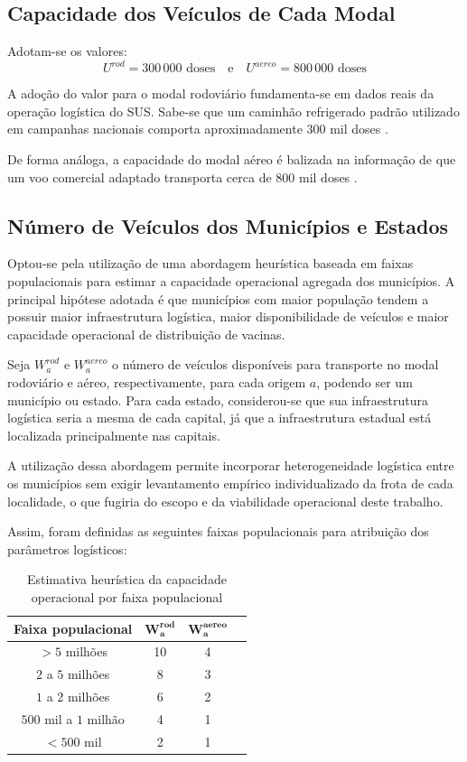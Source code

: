 \subsection{Capacidade dos Veículos de Cada Modal}

Adotam-se os valores:
\[U^{rod} = 300\,000 \text{ doses} \quad \text {e} \quad U^{aereo} = 800\,000 \text{ doses}\]

A adoção do valor para o modal rodoviário fundamenta-se em dados reais da operação logística do SUS. Sabe-se que um caminhão refrigerado padrão utilizado em campanhas nacionais comporta aproximadamente 300 mil doses \cite{g1:2021}.

De forma análoga, a capacidade do modal aéreo é balizada na informação de que um voo comercial adaptado transporta cerca de 800 mil doses \cite{tvbrasil:2021}.

\subsection{Número de Veículos dos Municípios e Estados}

Optou-se pela utilização de uma abordagem heurística baseada em faixas populacionais para estimar a capacidade operacional agregada dos municípios. A principal hipótese adotada é que municípios com maior população tendem a possuir maior infraestrutura logística, maior disponibilidade de veículos e maior capacidade operacional de distribuição de vacinas.

Seja $W_a^{rod}$ e $W_a^{aereo}$ o número de veículos disponíveis para transporte no modal rodoviário e aéreo, respectivamente, para cada origem $a$, podendo ser um município ou estado. Para cada estado, considerou-se que sua infraestrutura logística seria a mesma de cada capital, já que a infraestrutura estadual está localizada principalmente nas capitais.

A utilização dessa abordagem permite incorporar heterogeneidade logística entre os municípios sem exigir levantamento empírico individualizado da frota de cada localidade, o que fugiria do escopo e da viabilidade operacional deste trabalho.

Assim, foram definidas as seguintes faixas populacionais para atribuição dos parâmetros logísticos:

\begin{table}[H]
\centering
\caption{Estimativa heurística da capacidade operacional por faixa populacional}
\label{tab:frota_populacional}
\begin{tabular}{|c|c|c|c|}
\hline
\textbf{Faixa populacional} & $\mathbf{W_a^{rod}}$ & $\mathbf{W_a^{aereo}}$ \\
\hline
$> 5$ milhões & 10 & 4 \\
\hline
$2$ a $5$ milhões & 8 & 3 \\
\hline
$1$ a $2$ milhões & 6 & 2 \\
\hline
$500$ mil a $1$ milhão & 4 & 1 \\
\hline
$< 500$ mil & 2 & 1 \\
\hline
\end{tabular}
\end{table}

